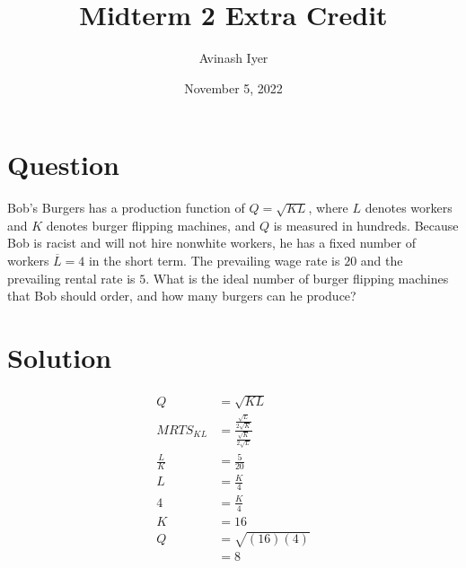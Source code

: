 \documentclass[8pt]{extarticle}
\title{Midterm 2 Extra Credit}
\author{Avinash Iyer}
\date{November 5, 2022}
\begin{document}
{
\maketitle
\section*{Question}
Bob's Burgers has a production function of $Q = \sqrt{KL}$, where $L$ denotes workers and $K$ denotes burger flipping machines, and $Q$ is measured in hundreds. Because Bob is racist and will not hire nonwhite workers, he has a fixed number of workers $\overline{L} = 4$ in the short term. The prevailing wage rate is $20$ and the prevailing rental rate is $5$. What is the ideal number of burger flipping machines that Bob should order, and how many burgers can he produce?
\section*{Solution}
\begin{align*}
	Q &= \sqrt{KL} \\
	MRTS_{KL} &= \frac{\frac{\sqrt{L}}{2\sqrt{K}}}{\frac{\sqrt{K}}{2\sqrt{L}}} \\
	\frac{L}{K} &= \frac{5}{20}\\
	L &= \frac{K}{4} \\
	4 &= \frac{K}{4}\\
	K &= \boxed{16}\\
	Q &= \sqrt{(16)(4)}\\
	&= \boxed{8}
\end{align*}
}
\end{document}
